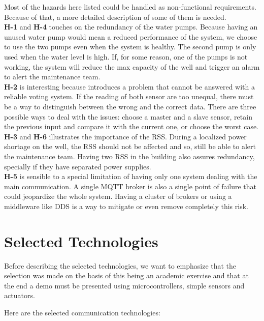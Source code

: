\documentclass[11pt]{article}
\begin{document}
Most of the hazards here listed could be handled as non-functional requirements. Because of that, a more detailed description of some of them is needed.
\\[12pt]
\textbf{H-1} and \textbf{H-4} touches on the redundancy of the water pumps. Because having an unused water pump would mean a reduced performance of the system, we choose to use the two pumps even when the system is healthy. The second pump is only used when the water level is high. If, for some reason, one of the pumps is not working, the system will reduce the max capacity of the well and trigger an alarm to alert the maintenance team.
\\[12pt]
\textbf{H-2} is interesting because introduces a problem that cannot be answered with a reliable voting system. If the reading of both sensor are too unequal, there must be a way to distinguish between the wrong and the correct data. There are three possible ways to deal with the issues: choose a master and a slave sensor, retain the previous input and compare it with the current one, or choose the worst case.
\\[12pt]
\textbf{H-3} and \textbf{H-6} illustrates the importance of the RSS. During a localized power shortage on the well, the RSS should not be affected and so, still be able to alert the maintenance team. Having two RSS in the building also assures redundancy, specially if they have separated power supplies.
\\[12pt]
\textbf{H-5} is sensible to a special limitation of having only one system dealing with the main communication. A single MQTT broker is also a single point of failure that could jeopardize the whole system. Having a cluster of brokers or using a middleware like DDS is a way to mitigate or even remove completely this risk.

\newpage
\section{Selected Technologies}

Before describing the selected technologies, we want to emphasize that the selection was made on the basis of this being an academic exercise and that at the end a demo must be presented using microcontrollers, simple sensors and actuators.

Here are the selected communication technologies:
\end{document}

